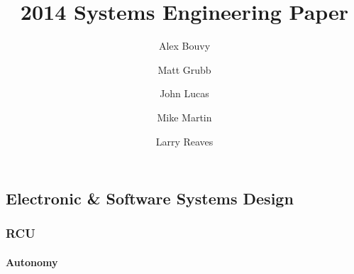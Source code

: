 \documentclass{article}
\begin{document}
\title{2014 Systems Engineering Paper}
\author{Alex Bouvy \and Matt Grubb \and John Lucas \and Mike Martin \and Larry Reaves}
\maketitle
\pagebreak
\tableofcontents
\listoffigures
\pagebreak
\begin{multicols}{2}
\part{Electronic \& Software Systems Design}
\section{RCU}
\subsection{Autonomy}



\end{multicols}
\end{document}
